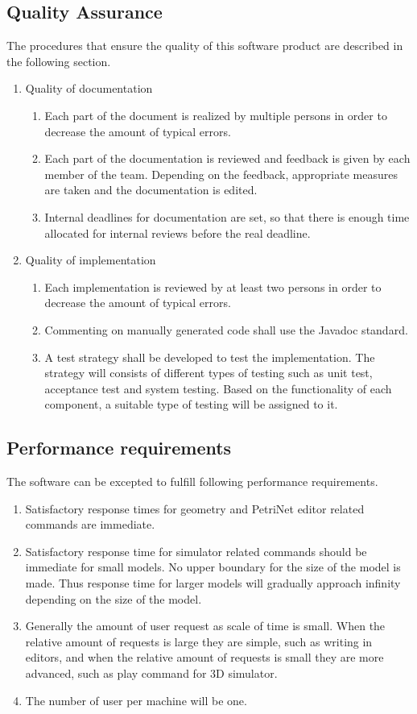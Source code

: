 \subsection{Quality Assurance}
The procedures that ensure the quality of this software product are described in the following section.
\begin{enumerate}
	\item Quality of documentation
	\begin{enumerate}
		\item Each part of the document is realized by multiple persons in order to decrease the amount of typical errors.
		\item Each part of the documentation is reviewed and feedback is given by each member of the team. Depending on the feedback, appropriate measures are taken and the documentation is edited.
		\item Internal deadlines for documentation are set, so that there is enough time allocated for internal reviews before the real deadline.
	\end{enumerate}
	\item Quality of implementation
	\begin{enumerate}
		\item Each implementation is reviewed by at least two persons in order to decrease the amount of typical errors.
		\item Commenting on manually generated code shall use the Javadoc standard.
		\item A test strategy shall be developed to test the implementation. The strategy will consists of different types of testing such as unit test, acceptance test and system testing. Based on the functionality of each component, a suitable type of testing will be assigned to it. 
	\end{enumerate}
\end{enumerate}

\subsection{Performance requirements}
The software can be excepted to fulfill following performance requirements.
\begin{enumerate}
	\item Satisfactory response times for geometry and PetriNet editor related commands are immediate.
	\item Satisfactory response time for simulator related commands should be immediate for small models. No upper boundary for the size of the model is made. Thus response time for larger models will gradually approach infinity depending on the size of the model.
	\item Generally the amount of user request as scale of time is small. When the relative amount of requests is large they are simple, such as writing in editors, and when the relative amount of requests is small they are more advanced, such as play command for 3D simulator.
	\item The number of user per machine will be one.
\end{enumerate}